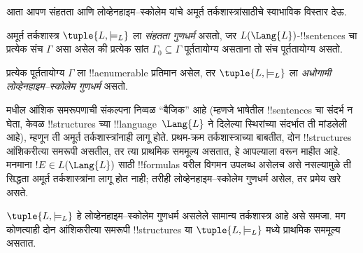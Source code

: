 \documentclass[../../../include/open-logic-section]{subfiles}
\begin{document}


आता आपण संहतता आणि लोव्हेनहाइम--स्कोलेम यांचे अमूर्त तर्कशास्त्रांसाठीचे
स्वाभाविक विस्तार देऊ.

\begin{defn}
अमूर्त तर्कशास्त्र $\tuple{L, \models_L}$ ला \emph{संहतता गुणधर्म}
असतो, जर $L(\Lang{L})$-!!{sentence}s चा प्रत्येक संच $\Gamma$ असा
असेल की प्रत्येक सांत $\Gamma_0 \subseteq \Gamma$ पूर्ततायोग्य असताना
तो संच पूर्ततायोग्य असतो.
\end{defn}

\begin{defn}
प्रत्येक पूर्ततायोग्य $\Gamma$ ला !!a{enumerable} प्रतिमान असेल, तर
$\tuple{L, \models_L}$ ला \emph{अधोगामी लोव्हेनहाइम--स्कोलेम गुणधर्म}
असतो.
\end{defn}


 मधील आंशिक समरूपणाची संकल्पना निव्वळ
``बैजिक'' आहे (म्हणजे भाषेतील !!{sentence}s चा संदर्भ न घेता, केवळ
!!{structure}s च्या !!{language}~$\Lang{L}$ ने दिलेल्या स्थिरांच्या
संदर्भात ती मांडलेली आहे), म्हणून ती अमूर्त तर्कशास्त्रांनाही लागू होते.
प्रथम-क्रम तर्कशास्त्राच्या बाबतीत, दोन !!{structure}s आंशिकरीत्या समरूपी
असतील, तर त्या प्राथमिक सममूल्य असतात, हे आपल्याला
 वरून माहीत आहे. मनमाना $!E \in
L(\Lang{L})$ साठी !!{formula}s वरील विगमन उपलब्ध असेलच असे नसल्यामुळे ती
सिद्धता अमूर्त तर्कशास्त्रांना लागू होत नाही; तरीही लोव्हेनहाइम--स्कोलेम
गुणधर्म असेल, तर प्रमेय खरे असते.

\begin{thm}
$\tuple{L, \models_L}$ हे लोव्हेनहाइम--स्कोलेम गुणधर्म असलेले सामान्य
तर्कशास्त्र आहे असे समजा. मग कोणत्याही दोन आंशिकरीत्या समरूपी
!!{structure}s या $\tuple{L, \models_L}$ मध्ये प्राथमिक सममूल्य असतात.
\end{thm}
\end{document}
